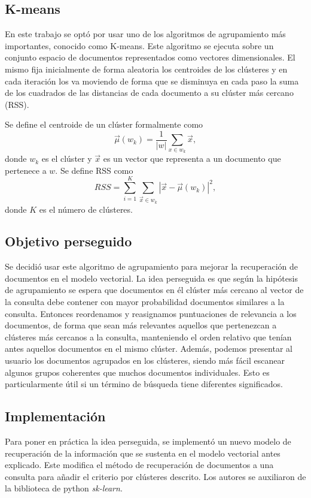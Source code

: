 \documentclass{llncs}
\begin{document}
	\subsection{K-means}
		En este trabajo se opt\'o por usar uno de los algoritmos de agrupamiento m\'as importantes, conocido como K-means. Este algoritmo se ejecuta sobre un conjunto espacio de documentos representados como vectores dimensionales. El mismo fija inicialmente de forma aleatoria los centroides de los cl\'usteres y en cada iteraci\'on los va moviendo de forma que se disminuya en cada paso la suma de los cuadrados de las distancias de cada documento a su cl\'uster m\'as cercano (RSS).
		
		Se define el centroide de un cl\'uster formalmente como 
		\[
		\overrightarrow{\mu}(w_k) = \frac{1}{|w|}\sum_{x \in w_k} \overrightarrow{x},
		\]
		donde $w_k$ es el cl\'uster y $\overrightarrow{x}$ es un vector que representa a un documento que pertenece a $w$. Se define RSS como 
		\[
			RSS = \sum_{i = 1}^K \sum_{\overrightarrow{x} \in w_k} |\overrightarrow{x} - \overrightarrow{\mu}(w_k)|^2,
		\]
		donde $K$ es el n\'umero de cl\'usteres.
	
	\subsection{Objetivo perseguido}
	
	Se decidi\'o usar este algoritmo de agrupamiento para mejorar la recuperaci\'on de documentos en el modelo vectorial. La idea perseguida es que seg\'un la hip\'otesis de agrupamiento se espera que documentos en \'el cl\'uster m\'as cercano al vector de la consulta debe contener con mayor probabilidad documentos similares a la consulta. Entonces reordenamos y reasignamos puntuaciones de relevancia a los documentos, de forma que sean m\'as relevantes aquellos que pertenezcan a cl\'usteres m\'as cercanos a la consulta, manteniendo el orden relativo que ten\'ian antes aquellos documentos en el mismo cl\'uster. Adem\'as, podemos presentar al usuario los documentos agrupados en los cl\'usteres, siendo m\'as f\'acil escanear algunos grupos
	coherentes que muchos documentos individuales. Esto es particularmente \'util
	si un t\'ermino de b\'usqueda tiene diferentes significados.
	 
	\subsection{Implementaci\'on}
	Para poner en pr\'actica la idea perseguida, se implement\'o un nuevo modelo de recuperaci\'on de la informaci\'on que se sustenta en el modelo vectorial antes explicado. Este modifica el m\'etodo de recuperaci\'on de documentos a una consulta para a\~nadir el criterio por cl\'usteres descrito. Los autores se auxiliaron de la biblioteca de python \emph{sk-learn}.
\end{document}
